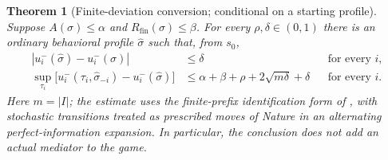 \documentclass[11pt,a4paper]{article}
\numberwithin{equation}{section}
\newtheorem{theorem}{Theorem}[section]
\theoremstyle{definition}
\theoremstyle{remark}
\newcommand{\sig}{\sigma}
\begin{document}
\begin{theorem}[Finite-deviation conversion; conditional on a starting
profile]\label{thm:conversion}
Suppose $A(\sig)\le\alpha$ and $R_{\mathrm{fin}}(\sig)\le\beta$.
For every $\rho,\delta\in(0,1)$ there is an ordinary behavioral profile
$\widehat\sig$ such that, from $s_0$,
\begin{align}
 |u_i^-(\widehat\sig)-u_i^-(\sig)|&\le\delta
 &&\text{for every }i,\label{eq:convpay}\\
 \sup_{\tau_i}\bigl[
 u_i^-(\tau_i,\widehat\sig_{-i})-u_i^-(\widehat\sig)
 \bigr]
 &\le\alpha+\beta+\rho+2\sqrt{m\delta}+\delta
 &&\text{for every }i.\label{eq:conveps}
\end{align}
Here $m=|I|$; the estimate uses the finite-prefix identification
form of \cite[Theorem~2.6 and Section~4]{alon2024}, with stochastic
transitions treated as prescribed moves of Nature in an alternating
perfect-information expansion. In particular, the conclusion does
\emph{not} add an actual mediator to the game.
\end{theorem}
\end{document}
